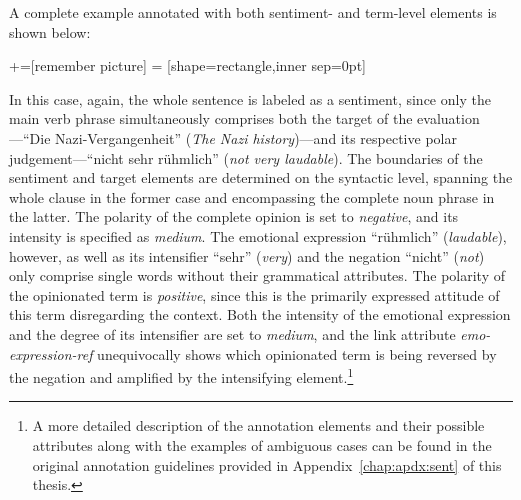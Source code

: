A complete example annotated with both sentiment- and term-level
elements is shown below:
\begin{example}\label{snt:exmp:sent-anno2}
  +=[remember picture]
   = [shape=rectangle,inner sep=0pt]
  \upshape{}\\[2.2em]
  \noindent{}

\end{example}
In this case, again, the whole sentence is labeled as a sentiment,
since only the main verb phrase simultaneously comprises both the
target of the evaluation---``Die Nazi-Vergangenheit'' (\emph{The Nazi
  history})---and its respective polar judgement---``nicht sehr
r\"uhmlich'' (\emph{not very laudable}).  The boundaries of the
sentiment and target elements are determined on the syntactic level,
spanning the whole clause in the former case and encompassing the
complete noun phrase in the latter.  The polarity of the complete
opinion is set to \emph{negative}, and its intensity is specified as
\emph{medium}.  The emotional expression ``r\"uhmlich''
(\emph{laudable}), however, as well as its intensifier ``sehr''
(\emph{very}) and the negation ``nicht'' (\emph{not}) only comprise
single words without their grammatical attributes.  The polarity of
the opinionated term is \emph{positive}, since this is the primarily
expressed attitude of this term disregarding the context.  Both the
intensity of the emotional expression and the degree of its
intensifier are set to \emph{medium}, and the link attribute
\emph{emo-expression-ref} unequivocally shows which opinionated term
is being reversed by the negation and amplified by the intensifying
element.\footnote{A more detailed description of the annotation
  elements and their possible attributes along with the examples of
  ambiguous cases can be found in the original annotation guidelines
  provided in Appendix~\ref{chap:apdx:sent} of this thesis.}

